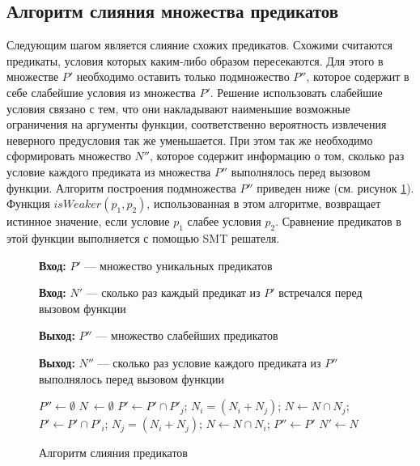 \subsection{Алгоритм слияния множества предикатов}
Следующим шагом является слияние схожих предикатов. Схожими  считаются предикаты, условия которых каким-либо образом пересекаются. Для этого в множестве $P'$ необходимо оставить только подмножество $P''$, которое содержит в себе слабейшие условия из множества $P'$. Решение использовать слабейшие условия связано с тем, что они накладывают наименьшие возможные ограничения на аргументы функции, соответственно вероятность извлечения неверного предусловия так же уменьшается. При этом так же необходимо сформировать множество $N''$, которое содержит информацию о том, сколько раз условие каждого предиката из множества $P''$ выполнялось перед вызовом функции. Алгоритм построения подмножества $P''$ приведен ниже (см. рисунок \ref{image:megringAlgoritm}). Функция $isWeaker(p_1, p_2)$, использованная в этом алгоритме, возвращает истинное значение, если условие $p_1$ слабее условия $p_2$. Сравнение предикатов в этой функции выполняется с помощью SMT решателя.
\begin{figure}[h!]
\textbf{Вход:} $P'$ --- множество уникальных предикатов

\textbf{Вход:} $N'$ --- сколько раз каждый предикат из $P'$ встречался перед вызовом функции

\textbf{Выход:} $P''$ --- множество слабейших предикатов

\textbf{Выход:} $N''$ --- сколько раз условие каждого предиката из $P''$ выполнялось перед вызовом функции

\begin{algorithmic}[1]
\State $P'' \leftarrow \emptyset$
\State $N\ \leftarrow \emptyset$
			\State $P' \leftarrow P' \cap P'_j$;
			\State $N_i = (N_i + N_j)$;
			\State $N \leftarrow N \cap N_j$;
		\Else 
				\State $P' \leftarrow P' \cap P'_i$;
				\State $N_j = (N_i + N_j)$;
				\State $N \leftarrow N \cap N_i$;
    			\EndIf
    		\EndIf
    \EndFor
\EndFor
\State $P'' \leftarrow P'$
\State $N' \leftarrow N$
\end{algorithmic}
\caption{Алгоритм слияния предикатов}
\label{image:megringAlgoritm}
\end{figure}

